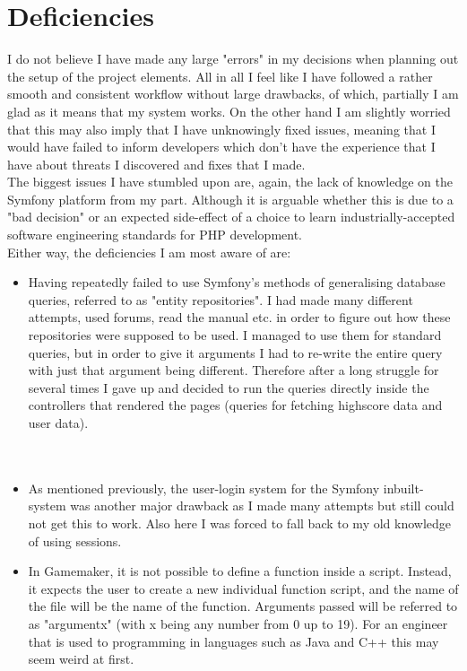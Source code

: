 \documentclass[12pt]{report}
\begin{document}
\section*{Deficiencies}
I do not believe I have made any large "errors" in my decisions when planning out the setup of the project elements. All in all I feel like I have followed a rather smooth and consistent workflow without large drawbacks, of which, partially I am glad as it means that my system works. On the other hand I am slightly worried that this may also imply that I have unknowingly fixed issues, meaning that I would have failed to inform developers which don't have the experience that I have about threats I discovered and fixes that I made.\\
The biggest issues I have stumbled upon are, again, the lack of knowledge on the Symfony platform from my part. Although it is arguable whether this is due to a "bad decision" or an expected side-effect of a choice to learn industrially-accepted software engineering standards for PHP development.\\
Either way, the deficiencies I am most aware of are:
\begin{itemize}
\item Having repeatedly failed to use Symfony's methods of generalising database queries, referred to as "entity repositories". I had made many different attempts, used forums, read the manual etc. in order to figure out how these repositories were supposed to be used. I managed to use them for standard queries, but in order to give it arguments I had to re-write the entire query with just that argument being different. Therefore after a long struggle for several times I gave up and decided to run the queries directly inside the controllers that rendered the pages (queries for fetching highscore data and user data).\\\\\\
\item As mentioned previously, the user-login system for the Symfony inbuilt-system was another major drawback as I made many attempts but still could not get this to work. Also here I was forced to fall back to my old knowledge of using sessions.
\item In Gamemaker, it is not possible to define a function inside a script. Instead, it expects the user to create a new individual function script, and the name of the file will be the name of the function. Arguments passed will be referred to as "argumentx" (with x being any number from 0 up to 19). For an engineer that is used to programming in languages such as Java and C++ this may seem weird at first.
\end{itemize}
\end{document}
